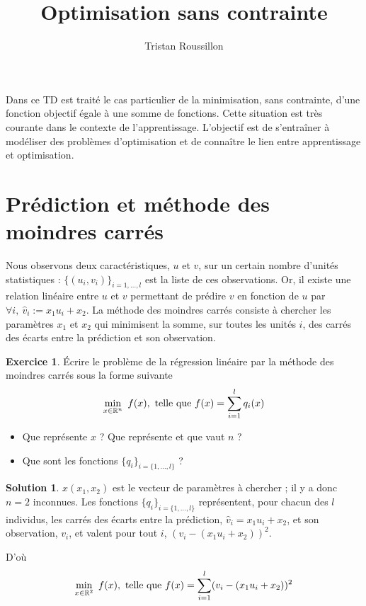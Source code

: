 \documentclass[a4paper,francais]{article}
\title{Optimisation sans contrainte}
\author{Tristan Roussillon}
\newcommand{\R}{{\ensuremath\mathbb{R}}}
\theoremstyle{definition}
\newtheorem{exercice}{Exercice}[section]
\newtheorem*{solution}{Solution}
\begin{document}
\maketitle

Dans ce TD est traité le cas particulier de la minimisation, sans contrainte,
d'une fonction objectif égale à une somme de fonctions. Cette situation est
très courante dans le contexte de l'apprentissage. L'objectif est de s'entraîner
à modéliser des problèmes d'optimisation et de connaître le lien entre apprentissage
et optimisation. 

\section{Prédiction et méthode des moindres carrés}
\label{sec:mc}

Nous observons deux caractéristiques, $u$ et $v$, sur un certain nombre d'unités
statistiques : $\{(u_i,v_i)\}_{i = 1,\dots, l}$ est la liste de ces observations.
Or, il existe une relation linéaire entre $u$ et $v$ permettant
de prédire $v$ en fonction de $u$ par $\forall i, \ \hat{v}_i := x_1u_i + x_2$.
La méthode des moindres carrés consiste à chercher les paramètres $x_1$ et $x_2$
qui minimisent la somme, sur toutes les unités $i$, des carrés des écarts entre la
prédiction et son observation. 

\begin{exercice}
  \'Ecrire le problème de la régression linéaire par la méthode des moindres carrés
  sous la forme suivante
  \[
  \min_{x \in \R^n} \ f(x), \ \text{telle que} \
  f(x) = \sum_{i = 1}^l q_i(x) 
  \]

  \begin{itemize}
  \item Que représente $x$ ? Que représente et que vaut $n$ ?
  \item Que sont les fonctions $\{q_i\}_{i = \{1,\dots,l\}}$ ?
  \end{itemize}
\end{exercice}

\begin{solution}
  $x(x_1,x_2)$ est le vecteur de paramètres à chercher ; il y a donc $n=2$ inconnues.
  Les fonctions $\{q_i\}_{i = \{1,\dots,l\}}$ représentent, pour chacun des $l$ individus, les carrés des
  écarts entre la prédiction, $\hat{v}_i = x_1u_i + x_2$, et son observation, $v_i$, et valent pour tout $i$,
  $(v_i - (x_1u_i + x_2))^2$.

  D'où
  \[
  \min_{x \in \R^2} \ f(x), \ \text{telle que} \
  f(x) = \sum_{i = 1}^l (v_i - (x_1u_i + x_2))^2 
  \]
\end{solution}
\end{document}
